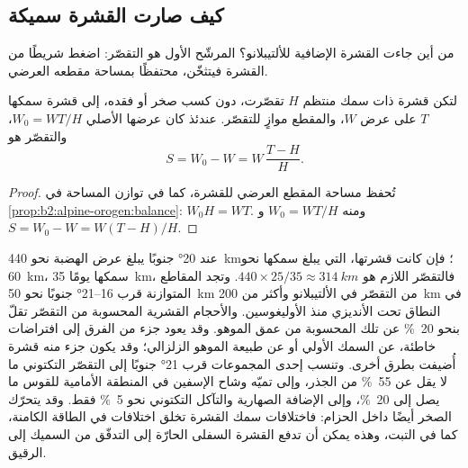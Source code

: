 \begin{omfigure}
\par{}
\end{omfigure}

\subsection{كيف صارت القشرة سميكة}

من أين جاءت القشرة الإضافية للألتيبلانو؟ المرشّح الأول هو التقصّر:
اضغط شريطًا من القشرة فيتثخّن، محتفظًا بمساحة مقطعه العرضي.

\begin{proposition}\label{prop:b2:himalaya-andes:shortening}
لتكن قشرة ذات سمك منتظم $H$ تقصّرت، دون كسب صخر أو فقده، إلى قشرة
سمكها $T$ على عرض $W$، والمقطع موازٍ للتقصّر. عندئذ كان
عرضها الأصلي $W_0 = W T/H$، والتقصّر هو
\[
  S = W_0 - W = W\,\frac{T - H}{H} .
\]
\end{proposition}

\begin{proof}
تُحفظ مساحة المقطع العرضي للقشرة، كما في توازن المساحة في
\cref{prop:b2:alpine-orogen:balance}: $W_0 H = W T$. ومنه $W_0 = WT/H$ و$S = W_0 - W =
W(T - H)/H$.
\end{proof}

عند \ang{20} جنوبًا يبلغ عرض الهضبة نحو \qty{440}{km}؛ فإن كانت قشرتها، التي يبلغ سمكها نحو \qty{60}{km}،
سمكها يومًا \qty{35}{km}، فالتقصّر اللازم هو $440 \times 25/35 \approx \qty{314}{km}$.
وتجد المقاطع المتوازنة قرب 16--\ang{21} جنوبًا نحو \qty{50}{km} من التقصّر في الألتيبلانو
وأكثر من \qty{200}{km} في النطاق تحت الأنديزي منذ الأوليغوسين. والأحجام القشرية
المحسوبة من التقصّر تقلّ بنحو \qty{20}{\percent} عن تلك المحسوبة من عمق
الموهو. وقد يعود جزء من الفرق إلى افتراضات خاطئة، عن السمك الأولي أو
عن طبيعة الموهو الزلزالي؛ وقد يكون جزء منه قشرة أُضيفت بطرق أخرى. وتنسب إحدى المجموعات قرب
\ang{21} جنوبًا إلى التقصّر التكتوني ما لا يقل عن \qty{55}{\percent} من الجذر، وإلى
تميّه وشاح الإسفين في المنطقة الأمامية للقوس ما يصل إلى \qty{20}{\percent}، وإلى الإضافة الصهارية
والتآكل التكتوني نحو \qty{5}{\percent} فقط. وقد يتحرّك الصخر أيضًا داخل الحزام:
فاختلافات سمك القشرة تخلق اختلافات في الطاقة الكامنة، كما في التبت،
وهذه يمكن أن تدفع القشرة السفلى الحارّة إلى التدفّق من السميك إلى الرقيق.

